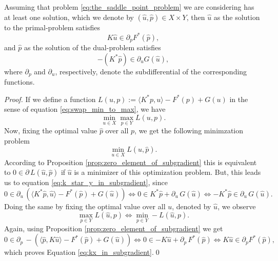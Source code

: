     Assuming that problem \ref{eq:the_saddle_point_problem} we are considering has at least one solution, which we denote by $(\hat{u}, \hat{p}) \in X \times Y$, then $\hat{u}$ as the solution to the primal-problem satisfies
        \begin{equation}
            K\hat{u} \in \partial_{p} F^{\ast}(\hat{p}),
            \label{eq:kx_in_subgradient}
        \end{equation}
    and $\hat{p}$ as the solution of the dual-problem satisfies
        \begin{equation}
            -(K^{\ast}\hat{p}) \in \partial_{u} G(\hat{u}),
            \label{eq:k_star_y_in_subgradient}
        \end{equation}
    where $\partial_{p}$ and $\partial_{u}$, respectively, denote the subdifferential of the corresponding functions.
        
    \begin{proof}
        If we define a function $L(u, p) := \langle K^{\ast}p, u \rangle - F^{\ast}(p) + G(u)$ in the sense of equation \ref{eq:swap_min_to_max}, we have
            $$
                \min_{u \in X} \max_{p \in Y} L(u, p).
            $$
        Now, fixing the optimal value $\hat{p}$ over all $p$, we get the following minimzation problem
            $$
                \min_{u \in X} L(u, \hat{p}).
            $$
        According to Proposition \ref{prop:zero_element_of_subgradient} this is equivalent to $0 \in \partial\,L(\hat{u}, \hat{p})$ if $\hat{u}$ is a minimizer of this optimization problem. But, this leads us to equation \ref{eq:k_star_y_in_subgradient}, since
            $$
                0 \in \partial_{u} \, (\langle K^{\ast}\hat{p}, \hat{u} \rangle - F^{\ast}(\hat{p}) + G(\hat{u})) \Longleftrightarrow 0 \in K^{\ast}\hat{p} + \partial_{u} \, G(\hat{u}) \Longleftrightarrow -K^{\ast}\hat{p} \in \partial_{u} \, G(\hat{u}).
            $$
        Doing the same by fixing the optimal value over all $u$, denoted by $\hat{u}$, we observe
            $$
                \max_{p \in Y} L(\hat{u}, p) \Longleftrightarrow \min_{p \in Y} -L(\hat{u}, p).
            $$
        Again, using Proposition \ref{prop:zero_element_of_subgradient} we get
            $$
                0 \in \partial_{p} \, -(\langle \hat{p}, K\hat{u} \rangle - F^{\ast}(\hat{p}) + G(\hat{u})) \Longleftrightarrow 0 \in -K\hat{u} + \partial_{p} \, F^{\ast}(\hat{p}) \Longleftrightarrow K\hat{u} \in \partial_{p} F^{\ast}(\hat{p}),
            $$
        which proves Equation \ref{eq:kx_in_subgradient}.\qed
    \end{proof}

